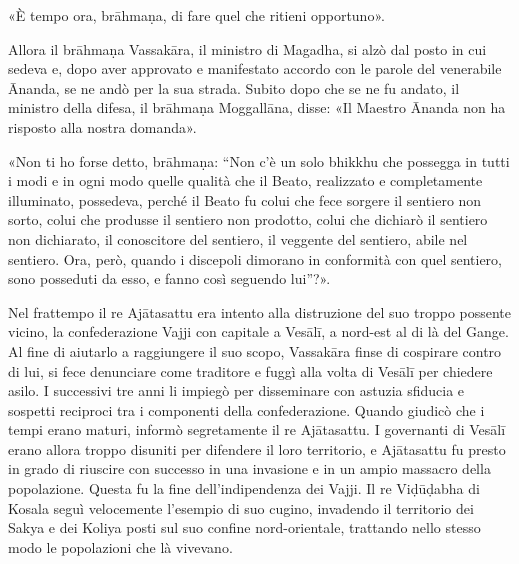 «È tempo ora, brāhmaṇa, di fare quel che ritieni opportuno».


Allora il brāhmaṇa Vassakāra, il ministro di Magadha, si alzò dal posto
in cui sedeva e, dopo aver approvato e manifestato accordo con le parole
del venerabile Ānanda, se ne andò per la sua strada. Subito dopo che se
ne fu andato, il ministro della difesa, il brāhmaṇa Moggallāna, disse:
«Il Maestro Ānanda non ha risposto alla nostra domanda».


«Non ti ho forse detto, brāhmaṇa: “Non c’è un solo bhikkhu che possegga
in tutti i modi e in ogni modo quelle qualità che il Beato, realizzato e
completamente illuminato, possedeva, perché il Beato fu colui che fece
sorgere il sentiero non sorto, colui che produsse il sentiero non
prodotto, colui che dichiarò il sentiero non dichiarato, il conoscitore
del sentiero, il veggente del sentiero, abile nel sentiero. Ora, però,
quando i discepoli dimorano in conformità con quel sentiero, sono
posseduti da esso, e fanno così seguendo lui”?».




 Nel frattempo il re Ajātasattu era intento alla
distruzione del suo troppo possente vicino, la confederazione Vajji con
capitale a Vesālī, a nord-est al di là del Gange. Al fine di aiutarlo a
raggiungere il suo scopo, Vassakāra finse di cospirare contro di lui, si
fece denunciare come traditore e fuggì alla volta di Vesālī per chiedere
asilo. I successivi tre anni li impiegò per disseminare con astuzia
sfiducia e sospetti reciproci tra i componenti della confederazione.
Quando giudicò che i tempi erano maturi, informò segretamente il re
Ajātasattu. I governanti di Vesālī erano allora troppo disuniti per
difendere il loro territorio, e Ajātasattu fu presto in grado di
riuscire con successo in una invasione e in un ampio massacro della
popolazione. Questa fu la fine dell’indipendenza dei Vajji. Il re
Viḍūḍabha di Kosala seguì velocemente l’esempio di suo cugino, invadendo
il territorio dei Sakya e dei Koliya posti sul suo confine
nord-orientale, trattando nello stesso modo le popolazioni che là
vivevano.


